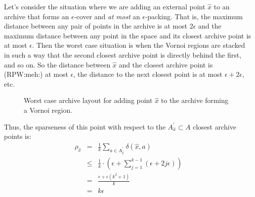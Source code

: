 \documentclass[twoside]{article}
\begin{document}
Let's consider the situation where we are adding an external point $\hat{x}$ to an archive that forms an $\epsilon$-cover and \emph{at most} an $\epsilon$-packing.  That is, the maximum distance between any pair of points in the archive is at most $2\epsilon$ and the maximum distance between any point in the space and its closest archive point is at most $\epsilon$.  Then the worst case situation is when the Vornoi regions are stacked in such a way that the second closest archive point is directly behind the first, and so on.  So the distance between $\hat{x}$ and the closest archive point is (RPW:meh:) at most $\epsilon$, the distance to the next closest point is at most $\epsilon + 2\epsilon$, etc.

\begin{figure}[t]
  \center{}
  \caption{\label{fig:vornoi} Worst case archive layout for adding point $\hat{x}$ to the archive forming a Vornoi region.}
\end{figure}

Thus, the sparseness of this point with respect to the $A^\prime_{\hat{x}} \subset A$ closest archive points is:
\begin{eqnarray*}
  \rho_{\hat{x}} & = & \frac{1}{k} \sum_{a \in A^\prime_{\hat{x}}} \delta(\hat{x},a) \\
                 & \leq & \frac{1}{k} \cdot\left( \epsilon + \sum_{j=1}^{k-1} \left( \epsilon + 2j\epsilon \right) \right) \\
                 & = & \frac{\epsilon + \epsilon\left(k^2 +1\right)}{k} \\
                 & = & k\epsilon
\end{eqnarray*}
\end{document}
